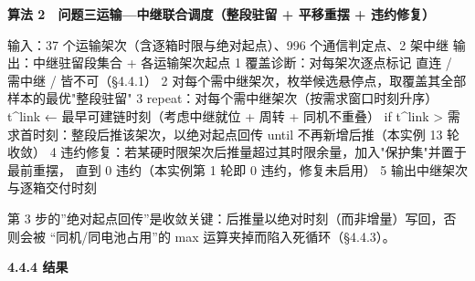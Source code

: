 \documentclass[
  10.5pt,
]{extarticle}
\newenvironment{Shaded}{}{}
\newcommand{\NormalTok}[1]{#1}
\begin{document}
\textbf{算法 2　问题三运输---中继联合调度（整段驻留 + 平移重摆 +
违约修复）}

\begin{Shaded}
\begin{Highlighting}[]
\NormalTok{输入：37 个运输架次（含逐箱时限与绝对起点）、996 个通信判定点、2 架中继}
\NormalTok{输出：中继驻留段集合 + 各运输架次起点}
\NormalTok{ 1  覆盖诊断：对每架次逐点标记 直连 / 需中继 / 皆不可（§4.4.1）}
\NormalTok{ 2  对每个需中继架次，枚举候选悬停点，取覆盖其全部样本的最优"整段驻留"}
\NormalTok{ 3  repeat：对每个需中继架次（按需求窗口时刻升序）}
\NormalTok{          t\^{}link ← 最早可建链时刻（考虑中继就位 + 周转 + 同机不重叠）}
\NormalTok{          if t\^{}link \textgreater{} 需求首时刻：整段后推该架次，以绝对起点回传}
\NormalTok{     until 不再新增后推（本实例 13 轮收敛）}
\NormalTok{ 4  违约修复：若某硬时限架次后推量超过其时限余量，加入"保护集"并置于最前重摆，}
\NormalTok{     直到 0 违约（本实例第 1 轮即 0 违约，修复未启用）}
\NormalTok{ 5  输出中继架次与逐箱交付时刻}
\end{Highlighting}
\end{Shaded}

第 3
步的''绝对起点回传''是收敛关键：后推量以绝对时刻（而非增量）写回，否则会被
``同机/同电池占用''的 max 运算夹掉而陷入死循环（§4.4.3）。

\textbf{4.4.4 结果}
\end{document}
